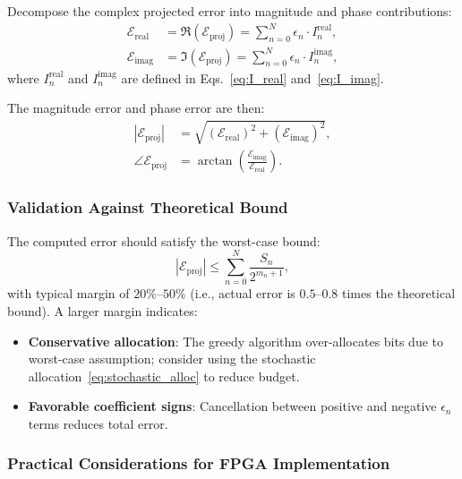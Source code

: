 Decompose the complex projected error into magnitude and phase contributions:
\begin{align}
\mathcal{E}_{\text{real}} &= \Re\left(\mathcal{E}_{\text{proj}}\right) = \sum_{n=0}^{N} \epsilon_n \cdot I_n^{\text{real}}, \label{eq:real_error} \\
\mathcal{E}_{\text{imag}} &= \Im\left(\mathcal{E}_{\text{proj}}\right) = \sum_{n=0}^{N} \epsilon_n \cdot I_n^{\text{imag}}, \label{eq:imag_error}
\end{align}
where $I_n^{\text{real}}$ and $I_n^{\text{imag}}$ are defined in Eqs.~\eqref{eq:I_real} and~\eqref{eq:I_imag}.

The magnitude error and phase error are then:
\begin{align}
|\mathcal{E}_{\text{proj}}| &= \sqrt{(\mathcal{E}_{\text{real}})^2 + (\mathcal{E}_{\text{imag}})^2}, \label{eq:mag_error} \\
\angle \mathcal{E}_{\text{proj}} &= \arctan\left(\frac{\mathcal{E}_{\text{imag}}}{\mathcal{E}_{\text{real}}}\right). \label{eq:phase_error}
\end{align}

\subsubsection{Validation Against Theoretical Bound}

The computed error should satisfy the worst-case bound:
\begin{equation}
|\mathcal{E}_{\text{proj}}| \leq \sum_{n=0}^{N} \frac{S_n}{2^{m_n+1}},
\label{eq:bound_check}
\end{equation}
with typical margin of $20\%$--$50\%$ (i.e., actual error is $0.5$--$0.8$ times the theoretical bound). A larger margin indicates:
\begin{itemize}
\item \textbf{Conservative allocation}: The greedy algorithm over-allocates bits due to worst-case assumption; consider using the stochastic allocation~\eqref{eq:stochastic_alloc} to reduce budget.
\item \textbf{Favorable coefficient signs}: Cancellation between positive and negative $\epsilon_n$ terms reduces total error.
\end{itemize}

\subsubsection{Practical Considerations for FPGA Implementation}


